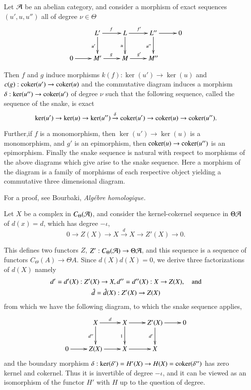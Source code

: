 \begin{snakelemma}\label{chap1-snakelem2.3}
Let $\mathcal{A}$ be an abelian category, and consider a morphism of exact
sequences $(u',u,u'')$ all of degree $\nu\in \Theta$
\[
\xymatrix{
 & L'\ar[d]_{u'}\ar[r]^{f} & L\ar[d]_{u}\ar[r]^{f'} &
  L''\ar[d]_{u''}\ar[r] & 0\\
0\ar[r] & M'\ar[r]^{g} & M\ar[r]^{g'} & M'' &
}
\]

Then $f$ and $g$ induce morphisms $k(f):\ker (u')\to \ker(u)$ and
$c(g):\operatorname{coker} (u')\to \operatorname{coker} (u)$ and the commutative diagram induces a
morphism $\delta:\ker(u'')\to \operatorname{coker} (u')$ of degree $\nu$ such that
the following sequence, called the sequence of the snake, is exact
$$
\ker(u')\to \ker(u)\to \ker(u'')\xrightarrow{\delta}\operatorname{coker} (u')\to
\operatorname{coker} (u)\to \operatorname{coker} (u'').
$$

Further,\pageoriginale if $f$ is a monomorphism, then $\ker(u')\to
\ker(u)$ is a mono\-mor\-phism, and $g'$ is an epimorphism, then $\operatorname{coker}
(u)\to \operatorname{coker} (u'')$ is an epimorphism. Finally the snake sequence is
natural with respect to morphisms of the above diagrams which give
arise to the snake sequence. Here a morphism of the diagram is a
family of morphisms of each respective object yielding a commutative
three dimensional diagram.
\end{snakelemma}

For a proof, see Bourbaki, {\em Alg\'ebre homologique.}

\begin{notation}\label{chap1-not2.4}
Let $X$ be a complex in $C_{\Theta}(\mathcal{A})$, and consider the
kernel-cokernel sequence in $\Theta\mathcal{A}$ of $d(x)=d$, which has degree
$-\iota$,
$$
0\to Z(X)\to X\xrightarrow{d}X\to Z'(X)\to 0.
$$

This defines two functors $Z$, $Z':C_{\Theta}(\mathcal{A})\to \Theta\mathcal{A}$, and
this sequence is a sequence of functors $C_{\Theta}(A)\to \Theta
A$. Since $d(X)d(X)=0$, we derive three factorizations of $d(X)$
namely
\begin{gather*}
d'=d'(X):Z'(X)\to X, d''=d''(X):X\to Z(X),\quad\text{and}\\
\hat{d}=\hat{d}(X):Z'(X)\to Z(X)
\end{gather*}
from which we have the following diagram, to which the snake sequence
applies, 
\[
\xymatrix{
 & X\ar[d]_{d''}\ar[r]^{d} & X\ar[d]_{1}\ar[r] &
  Z'(X)\ar[d]_{d'}\ar[r] & 0\\
0\ar[r] & Z(X)\ar[r] & X\ar[r] & X &
}
\]
and the boundary morphism $\delta:\ker(\delta')=H'(X)\to H(X)=\operatorname{coker}
(\delta'')$ has zero kernel and cokernel. Thus it is invertible of
degree $-\iota$, and it can be viewed as an isomorphism of the functor
$H'$ with $H$ up to the question of degree.
\end{notation}

